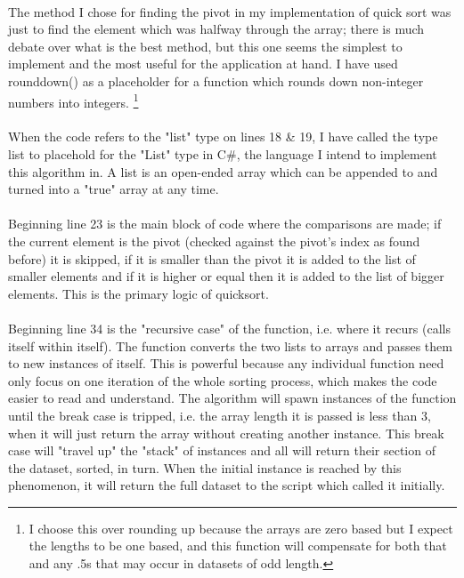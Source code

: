 ﻿\documentclass{article}
\begin{document}
    \paragraph{}
    The method I chose for finding the pivot in my implementation of quick sort was just to find the element which was halfway through the array; there is much debate over what is the best method, but this one seems the simplest to implement and the most useful for the application at hand.
    I have used rounddown() as a placeholder for a function which rounds down non-integer numbers into integers.
    \footnote{I choose this over rounding up because the arrays are zero based but I expect the lengths to be one based, and this function will compensate for both that and any .5s that may occur in datasets of odd length.}
    \paragraph{}
    When the code refers to the "list" type on lines 18 \& 19, I have called the type list to placehold for the "List" type in C\#, the language I intend to implement this algorithm in.
    A list is an open-ended array which can be appended to and turned into a "true" array at any time.
    \paragraph{}
    Beginning line 23 is the main block of code where the comparisons are made; if the current element is the pivot (checked against the pivot's index as found before) it is skipped, if it is smaller than the pivot it is added to the list of smaller elements and if it is higher or equal then it is added to the list of bigger elements.
    This is the primary logic of quicksort.
    \paragraph{}
    Beginning line 34 is the "recursive case" of the function, i.e. where it recurs (calls itself within itself).
    The function converts the two lists to arrays and passes them to new instances of itself.
    This is powerful because any individual function need only focus on one iteration of the whole sorting process, which makes the code easier to read and understand.
    The algorithm will spawn instances of the function until the break case is tripped, i.e. the array length it is passed is less than 3, when it will just return the array without creating another instance.
    This break case will "travel up" the "stack" of instances and all will return their section of the dataset, sorted, in turn.
    When the initial instance is reached by this phenomenon, it will return the full dataset to the script which called it initially.
\end{document}
